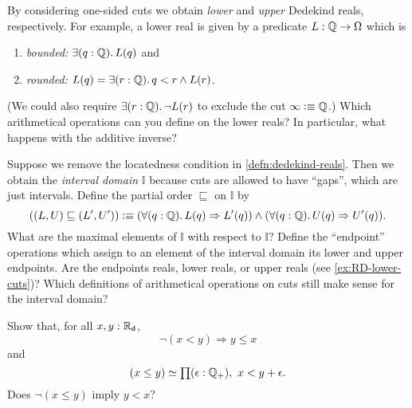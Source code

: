 \begin{ex} \label{ex:RD-lower-cuts}
  By considering one-sided cuts we obtain \emph{lower} and \emph{upper} Dedekind reals,
  respectively. For example, a lower real is given by a predicate $L : \mathbb{Q} \to \Omega$
  which is
  \begin{enumerate}
  \item \emph{bounded:} $\exis{q : \Q} L(q)$ and
  \item \emph{rounded:} $L(q) = \exis{r : \Q} q < r \land L(r)$.
  \end{enumerate}
  (We could also require $\exis{r : \Q} \lnot L(r)$ to exclude the cut $\infty \vcentcolon\equiv
  \mathbb{Q}$.) Which arithmetical operations can you define on the lower reals? In particular,
  what happens with the additive inverse?
\end{ex}

\begin{ex} \label{ex:RD-interval-arithmetic}
  Suppose we remove the locatedness condition in \autoref{defn:dedekind-reals}.
  Then we obtain the \emph{interval domain} $\mathbb{I}$ because cuts are allowed
  to have ``gaps'', which are just intervals. Define the partial order $\sqsubseteq$ on
  $\mathbb{I}$ by
  \begin{equation*}
    ((L, U) \sqsubseteq (L', U'))
    \defeq
    (\fall{q : \Q} L(q) \Rightarrow L'(q)) \land
    (\fall{q : \Q} U(q) \Rightarrow U'(q)).
  \end{equation*}
  What are the maximal elements of $\mathbb{I}$ with respect to $\mathbb{I}$? Define the
  ``endpoint'' operations which assign to an element of the interval domain its lower and
  upper endpoints. Are the endpoints reals, lower reals, or upper reals (see
  \autoref{ex:RD-lower-cuts})? Which definitions of arithmetical operations on cuts still
  make sense for the interval domain?
\end{ex}

\begin{ex} \label{ex:RD-lt-vs-le}
  Show that, for all $x, y : \mathbb{R}_\mathsf{d}$,
  \begin{equation*}
    \lnot (x < y) \Rightarrow y \leq x
  \end{equation*}
  and
  \begin{equation*}
    \eqv{(x \leq y)}{\prd{\epsilon : \Qp} x < y + \epsilon}.
  \end{equation*}
  Does $\lnot (x \leq y)$ imply $y < x$?
\end{ex}

